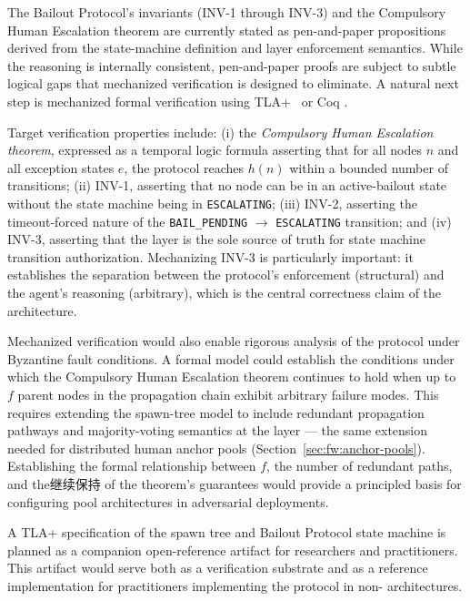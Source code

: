 The Bailout Protocol's invariants (INV-1 through INV-3) and the Compulsory Human Escalation theorem are currently stated as pen-and-paper propositions derived from the state-machine definition and \fact{} layer enforcement semantics. While the reasoning is internally consistent, pen-and-paper proofs are subject to subtle logical gaps that mechanized verification is designed to eliminate. A natural next step is mechanized formal verification using TLA+\ \cite{lamport2019tlaplus} or Coq \cite{coq2024}.

Target verification properties include: (i) the \textit{Compulsory Human Escalation theorem}, expressed as a temporal logic formula asserting that for all nodes $n$ and all exception states $e$, the protocol reaches $h(n)$ within a bounded number of transitions; (ii) INV-1, asserting that no node can be in an active-bailout state without the state machine being in \texttt{ESCALATING}; (iii) INV-2, asserting the timeout-forced nature of the \texttt{BAIL\_PENDING} $\rightarrow$ \texttt{ESCALATING} transition; and (iv) INV-3, asserting that the \fact{} layer is the sole source of truth for state machine transition authorization. Mechanizing INV-3 is particularly important: it establishes the separation between the protocol's enforcement (structural) and the agent's reasoning (arbitrary), which is the central correctness claim of the architecture.

Mechanized verification would also enable rigorous analysis of the protocol under Byzantine fault conditions. A formal model could establish the conditions under which the Compulsory Human Escalation theorem continues to hold when up to $f$ parent nodes in the propagation chain exhibit arbitrary failure modes. This requires extending the spawn-tree model to include redundant propagation pathways and majority-voting semantics at the \fact{} layer --- the same extension needed for distributed human anchor pools (Section~\ref{sec:fw:anchor-pools}). Establishing the formal relationship between $f$, the number of redundant paths, and the继续保持 of the theorem's guarantees would provide a principled basis for configuring pool architectures in adversarial deployments.

A TLA+ specification of the \bxthree{} spawn tree and Bailout Protocol state machine is planned as a companion open-reference artifact for researchers and practitioners. This artifact would serve both as a verification substrate and as a reference implementation for practitioners implementing the protocol in non-\bxthree{} architectures.

